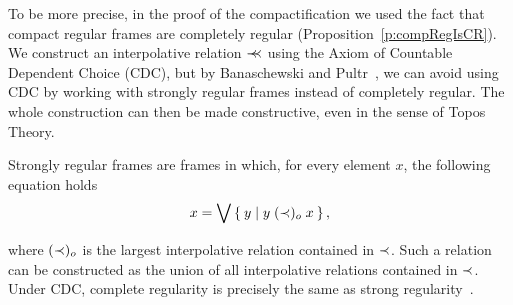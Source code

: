 To be more precise, in the proof of the compactification we used the fact that compact regular frames are completely regular (Proposition~\ref{p:compRegIsCR}).
We construct an interpolative relation $\prec\mkern-8mu\prec$ using the Axiom of Countable Dependent Choice (CDC), but by Banaschewski and Pultr~\cite{banaschewski2002constructive}, we can avoid using CDC by working with strongly regular frames instead of completely regular. The whole construction can then be made constructive, even in the sense of Topos Theory.

Strongly regular frames are frames in which, for every element $x$, the following equation holds
$$ x = \bigvee \Set{ y | y\;(\prec)_o\;x }, $$

\noindent where $(\prec)_o$ is the largest interpolative relation contained in $\prec$. Such a relation can be constructed as the union of all interpolative relations contained in $\prec$. Under CDC, complete regularity is precisely the same as strong regularity~\cite{banaschewski2002constructive}.
